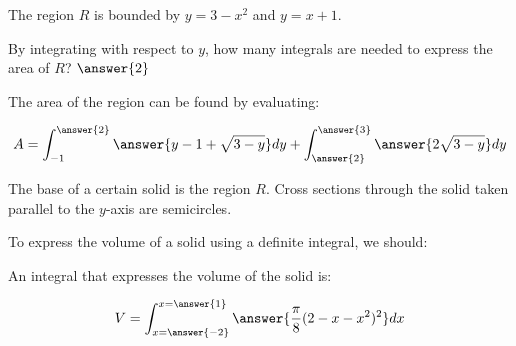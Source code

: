 \documentclass{ximera}
\author{Jim Talamo}
\begin{document}
The region $R$ is bounded by $y=3-x^2$ and $y=x+1$. 





\begin{exercise}
By integrating with respect to $y$, how many integrals are needed to express the area of $R$? $\answer{2}$

\begin{exercise}
The area of the region can be found by evaluating:

\[
	A = \int_{-1}^{\answer{2}} \answer{y-1+\sqrt{3-y}} dy  +\int_{\answer{2}}^{\answer{3}} \answer{2\sqrt{3-y}} dy 
\]
	
\end{exercise}
\end{exercise}


\begin{exercise}
The base of a certain solid is the region $R$.  Cross sections through the solid taken parallel to the $y$-axis are semicircles. 


To express the volume of a solid using a definite integral, we should:
\begin{multipleChoice}
\end{multipleChoice}

An integral that expresses the volume of the solid is:

\[
	V= \int_{x=\answer{-2}}^{x=\answer{1}}\answer{\frac{\pi}{8}(2-x-x^2)^2} dx
\]
		
		



\end{exercise}
\end{document}
